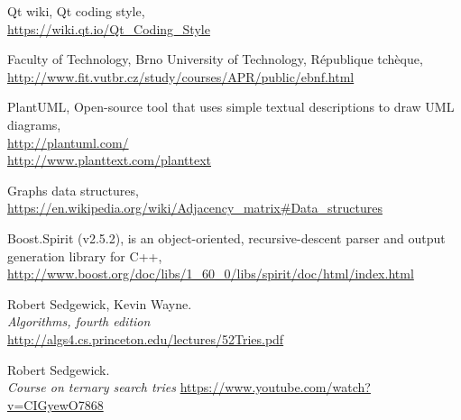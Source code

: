 \documentclass[french]{article}
\begin{document}
	\begin{thebibliography}{9}
		Qt wiki, Qt coding style,\\ \url{https://wiki.qt.io/Qt_Coding_Style}
		
		Faculty of Technology, Brno University of Technology, République tchèque,\\ \url{http://www.fit.vutbr.cz/study/courses/APR/public/ebnf.html}
		
		PlantUML, Open-source tool that uses simple textual descriptions to draw UML diagrams,\\ \url{http://plantuml.com/}\\ \url{http://www.planttext.com/planttext}

		Graphs data structures,\\ \url{https://en.wikipedia.org/wiki/Adjacency_matrix#Data_structures}
		
		Boost.Spirit (v2.5.2), is an object-oriented, recursive-descent parser and output generation library for C++,\\ \url{http://www.boost.org/doc/libs/1_60_0/libs/spirit/doc/html/index.html}
		
		Robert Sedgewick, Kevin Wayne.\\
		\emph{Algorithms, fourth edition}\\
		\url{http://algs4.cs.princeton.edu/lectures/52Tries.pdf}
		
		Robert Sedgewick.\\
		\emph{Course on ternary search tries}
		\url{https://www.youtube.com/watch?v=CIGyewO7868}
	\end{thebibliography}			
\end{document}
